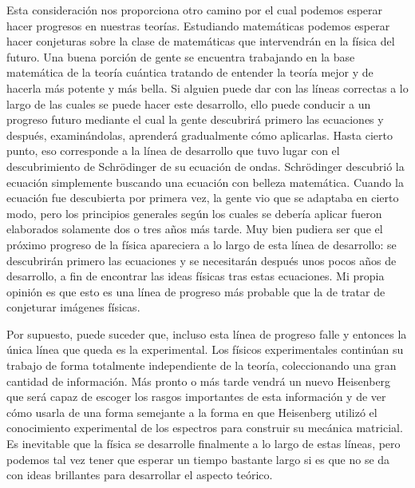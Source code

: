 \documentclass[a4paper, 12pt]{article}
\begin{document}
 Esta consideración nos proporciona otro camino por el cual podemos esperar hacer progresos en nuestras teorías. Estudiando matemáticas podemos esperar hacer conjeturas sobre la clase de matemáticas que intervendrán en la física del futuro. Una buena porción de gente se encuentra trabajando en la base matemática de la teoría cuántica tratando de entender la teoría mejor y de hacerla más potente y más bella. Si alguien puede dar con las líneas correctas a lo largo de las cuales se puede hacer este desarrollo, ello puede conducir a un progreso futuro mediante el cual la gente descubrirá primero las ecuaciones y después, examinándolas, aprenderá gradualmente cómo aplicarlas. Hasta cierto punto, eso corresponde a la línea de desarrollo que tuvo lugar con el descubrimiento de Schrödinger de su ecuación de ondas. Schrödinger descubrió la ecuación simplemente buscando una ecuación con belleza matemática. Cuando la ecuación fue descubierta por primera vez, la gente vio que se adaptaba en cierto modo, pero los principios generales según los cuales se debería aplicar fueron elaborados solamente dos o tres años más tarde. Muy bien pudiera ser que el próximo progreso de la física apareciera a lo largo de esta línea de desarrollo: se descubrirán primero las ecuaciones y se necesitarán después unos pocos años de desarrollo, a fin de encontrar las ideas físicas tras estas ecuaciones. Mi propia opinión es que esto es una línea de progreso más probable que la de tratar de conjeturar imágenes físicas.

Por supuesto, puede suceder que, incluso esta línea de progreso falle y entonces la única línea que queda es la experimental. Los físicos experimentales continúan su trabajo de forma totalmente independiente de la teoría, coleccionando una gran cantidad de información. Más pronto o más tarde vendrá un nuevo Heisenberg que será capaz de escoger los rasgos importantes de esta información y de ver cómo usarla de una forma semejante a la forma en que Heisenberg utilizó el conocimiento experimental de los espectros para construir su mecánica matricial. Es inevitable que la física se desarrolle finalmente a lo largo de estas líneas, pero podemos tal vez tener que esperar un tiempo bastante largo si es que no se da con ideas brillantes para desarrollar el aspecto teórico.
\end{document}
